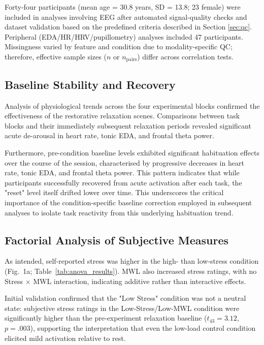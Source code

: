 \documentclass[lettersize,journal]{IEEEtran}
\begin{document}
Forty-four participants (mean age = 30.8 years, SD = 13.8; 23 female) were included in analyses involving EEG after automated signal-quality checks and dataset validation based on the predefined criteria described in Section \ref{sec:qc}. Peripheral (EDA/HR/HRV/pupillometry) analyses included 47 participants. Missingness varied by feature and condition due to modality-specific QC; therefore, effective sample sizes ($n$ or $n_{\mathrm{pairs}}$) differ across correlation tests.


\subsection{Baseline Stability and Recovery}
Analysis of physiological trends across the four experimental blocks confirmed the effectiveness of the restorative relaxation scenes. Comparisons between task blocks and their immediately subsequent relaxation periods revealed significant acute de-arousal in heart rate, tonic EDA, and frontal theta power.

Furthermore, pre-condition baseline levels exhibited significant habituation effects over the course of the session, characterised by progressive decreases in heart rate, tonic EDA, and frontal theta power. This pattern indicates that while participants successfully recovered from acute activation after each task, the "reset" level itself drifted lower over time. This underscores the critical importance of the condition-specific baseline correction employed in subsequent analyses to isolate task reactivity from this underlying habituation trend.

\subsection{Factorial Analysis of Subjective Measures}

As intended, self-reported stress was higher in the high- than low-stress condition (Fig.~1a; Table~\ref{tab:anova_results}). MWL also increased stress ratings, with no Stress $\times$ MWL interaction, indicating additive rather than interactive effects.

Initial validation confirmed that the "Low Stress" condition was not a neutral state: subjective stress ratings in the Low-Stress/Low-MWL condition were significantly higher than the pre-experiment relaxation baseline ($t_{43}=3.12$, $p=.003$), supporting the interpretation that even the low-load control condition elicited mild activation relative to rest.
\end{document}
